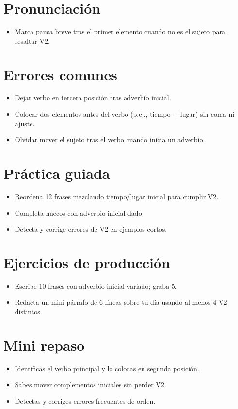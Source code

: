 \section{Pronunciación}
\begin{itemize}[leftmargin=*]
	\item Marca pausa breve tras el primer elemento cuando no es el sujeto para resaltar V2.
\end{itemize}

\section{Errores comunes}
\begin{itemize}[leftmargin=*]
	\item Dejar verbo en tercera posición tras adverbio inicial.
	\item Colocar dos elementos antes del verbo (p.ej., tiempo + lugar) sin coma ni ajuste.
	\item Olvidar mover el sujeto tras el verbo cuando inicia un adverbio.
\end{itemize}

\section{Práctica guiada}
\begin{itemize}[leftmargin=*]
	\item Reordena 12 frases mezclando tiempo/lugar inicial para cumplir V2.
	\item Completa huecos con adverbio inicial dado.
	\item Detecta y corrige errores de V2 en ejemplos cortos.
\end{itemize}

\section{Ejercicios de producción}
\begin{itemize}[leftmargin=*]
	\item Escribe 10 frases con adverbio inicial variado; graba 5.
	\item Redacta un mini párrafo de 6 líneas sobre tu día usando al menos 4 V2 distintos.
\end{itemize}

\section{Mini repaso}
\begin{itemize}[leftmargin=*]
	\item Identificas el verbo principal y lo colocas en segunda posición.
	\item Sabes mover complementos iniciales sin perder V2.
	\item Detectas y corriges errores frecuentes de orden.
\end{itemize}

